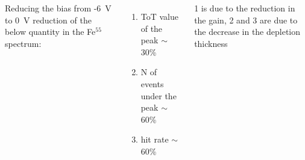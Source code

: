 \begin{frame}
\begin{columns}
            Reducing the bias from -\SI{6}{V} to \SI{0}{V} reduction of the below quantity in the Fe$^{55}$ spectrum: 
            \begin{enumerate}
                \item ToT value of the peak $\sim$30\%
                \item N of events under the peak $\sim$60\%
                \item hit rate $\sim$60\%
            \end{enumerate}
            1 is due to the reduction in the gain, 2 and 3 are due to the decrease in the depletion thickness
          
        \end{columns}
    \end{frame}      


